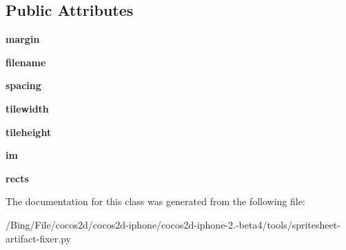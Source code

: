 \subsection*{Public Attributes}
\begin{DoxyCompactItemize}
\item 
\hypertarget{classspritesheet-artifact-fixer_1_1_sprite_sheet_margin_fix_a935f1242128fdae0c6ff4aa8cdfcd0b9}{{\bfseries margin}}\label{classspritesheet-artifact-fixer_1_1_sprite_sheet_margin_fix_a935f1242128fdae0c6ff4aa8cdfcd0b9}

\item 
\hypertarget{classspritesheet-artifact-fixer_1_1_sprite_sheet_margin_fix_a561cf226b31710d507224ffd32d0eb62}{{\bfseries filename}}\label{classspritesheet-artifact-fixer_1_1_sprite_sheet_margin_fix_a561cf226b31710d507224ffd32d0eb62}

\item 
\hypertarget{classspritesheet-artifact-fixer_1_1_sprite_sheet_margin_fix_a6f011174076765eccbebc25622a1fa5f}{{\bfseries spacing}}\label{classspritesheet-artifact-fixer_1_1_sprite_sheet_margin_fix_a6f011174076765eccbebc25622a1fa5f}

\item 
\hypertarget{classspritesheet-artifact-fixer_1_1_sprite_sheet_margin_fix_a8756944d6361e8306a88bf2479f0e1b1}{{\bfseries tilewidth}}\label{classspritesheet-artifact-fixer_1_1_sprite_sheet_margin_fix_a8756944d6361e8306a88bf2479f0e1b1}

\item 
\hypertarget{classspritesheet-artifact-fixer_1_1_sprite_sheet_margin_fix_aff69cf328a6d191c627cc1dc790507f6}{{\bfseries tileheight}}\label{classspritesheet-artifact-fixer_1_1_sprite_sheet_margin_fix_aff69cf328a6d191c627cc1dc790507f6}

\item 
\hypertarget{classspritesheet-artifact-fixer_1_1_sprite_sheet_margin_fix_a2faf6b169021dd6e36a2b176e54af660}{{\bfseries im}}\label{classspritesheet-artifact-fixer_1_1_sprite_sheet_margin_fix_a2faf6b169021dd6e36a2b176e54af660}

\item 
\hypertarget{classspritesheet-artifact-fixer_1_1_sprite_sheet_margin_fix_acd535ebecb7e3de1180d4867037710fd}{{\bfseries rects}}\label{classspritesheet-artifact-fixer_1_1_sprite_sheet_margin_fix_acd535ebecb7e3de1180d4867037710fd}

\end{DoxyCompactItemize}


The documentation for this class was generated from the following file\-:\begin{DoxyCompactItemize}
\item 
/\-Bing/\-File/cocos2d/cocos2d-\/iphone/cocos2d-\/iphone-\/2.-\/beta4/tools/spritesheet-\/artifact-\/fixer.\-py\end{DoxyCompactItemize}
